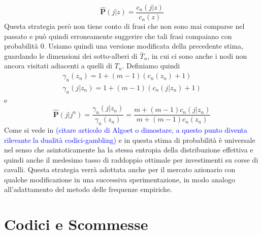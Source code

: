 \documentclass[a4paper,11pt]{book}
\theoremstyle{plain}
\theoremstyle{definition}
\theoremstyle{remark}
\newcommand{\Ph}{\hat{\mathbf{P}}}
\begin{document}
\begin{equation*}
	\Ph(j|z)=\frac{c_n(j|z)}{c_n(z)}
\end{equation*}
Questa strategia però non tiene conto di frasi che non sono mai comparse nel passato e può quindi erroneamente suggerire che tali frasi compaiano con probabilità $0$. Usiamo quindi una versione modificata della precedente stima, guardando le dimensioni dei sotto-alberi di $\bar{T}_n$, in cui ci sono anche i nodi non ancora visitati adiacenti a quelli di $T_n$. Definiamo quindi
\begin{align*}
	\gamma_n(z_n) = 1+(m-1)(c_n(z_n)+1)\\
	\gamma_n(j|z_n) = 1+(m-1)(c_n(j|z_n)+1)
\end{align*}
e
\begin{equation}\label{empLZ}
	\Ph(j|j^n) = \frac{\gamma_n(j|z_n)}{\gamma_n(z_n)}=\frac{m+(m-1)c_n(j|z_n)}{m+(m-1)c_n(z_n)}
\end{equation}
Come si vede in \cite{algoet1992}\textcolor{blue}{(citare articolo di Algoet o dimostare, a questo punto diventa rilevante la dualità codici-gambling)} e in \cite{CTElInfTeo} questa stima di probabilità è universale nel senso che asintoticamente ha la stessa entropia della distribuzione effettiva e quindi anche il medesimo tasso di raddoppio ottimale per investimenti su corse di cavalli. Questa strategia verrà adottata anche per il mercato azionario con qualche modificazione in una successiva sperimentazione, in modo analogo all'adattamento del metodo delle frequenze empiriche.
\section{Codici e Scommesse}
\end{document}

